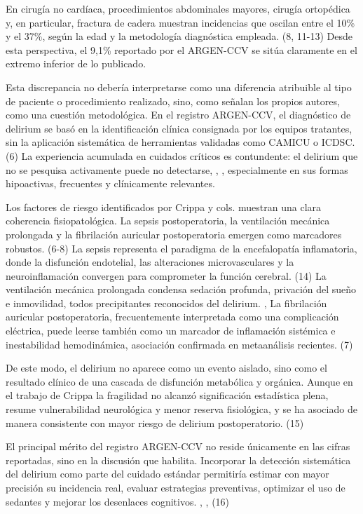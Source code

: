 \documentclass{article}
\begin{document}
En cirugía no cardíaca, procedimientos abdominales mayores, cirugía ortopédica y, en particular, fractura de cadera muestran incidencias que oscilan entre el 10\% y el 37\%, según la edad y la metodología diagnóstica empleada. (8, 11-13) Desde esta perspectiva, el 9,1\% reportado por el ARGEN-CCV se sitúa claramente en el extremo inferior de lo publicado.

Esta discrepancia no debería interpretarse como una diferencia atribuible al tipo de paciente o procedimiento realizado, sino, como señalan los propios autores, como una cuestión metodológica. En el registro ARGEN-CCV, el diagnóstico de delirium se basó en la identificación clínica consignada por los equipos tratantes, sin la aplicación sistemática de herramientas validadas como CAMICU o ICDSC. (6) La experiencia acumulada en cuidados críticos es contundente: el delirium que no se pesquisa activamente puede no detectarse, \cite{1262-ELY2004}, \cite{1298-INOUYE2014}, \cite{1299-WILSON2020} especialmente en sus formas hipoactivas, frecuentes y clínicamente relevantes.

Los factores de riesgo identificados por Crippa y cols. muestran una clara coherencia fisiopatológica. La sepsis postoperatoria, la ventilación mecánica prolongada y la fibrilación auricular postoperatoria emergen como marcadores robustos. (6-8) La sepsis representa el paradigma de la encefalopatía inflamatoria, donde la disfunción endotelial, las alteraciones microvasculares y la neuroinflamación convergen para comprometer la función cerebral. (14) La ventilación mecánica prolongada condensa sedación profunda, privación del sueño e inmovilidad, todos precipitantes reconocidos del delirium. \cite{1262-ELY2004}, \cite{1298-INOUYE2014} La fibrilación auricular postoperatoria, frecuentemente interpretada como una complicación eléctrica, puede leerse también como un marcador de inflamación sistémica e inestabilidad hemodinámica, asociación confirmada en metaanálisis recientes. (7)

De este modo, el delirium no aparece como un evento aislado, sino como el resultado clínico de una cascada de disfunción metabólica y orgánica. Aunque en el trabajo de Crippa la fragilidad no alcanzó significación estadística plena, resume vulnerabilidad neurológica y menor reserva fisiológica, y se ha asociado de manera consistente con mayor riesgo de delirium postoperatorio. (15)

El principal mérito del registro ARGEN-CCV no reside únicamente en las cifras reportadas, sino en la discusión que habilita. Incorporar la detección sistemática del delirium como parte del cuidado estándar permitiría estimar con mayor precisión su incidencia real, evaluar estrategias preventivas, optimizar el uso de sedantes y mejorar los desenlaces cognitivos. \cite{1262-ELY2004}, \cite{1298-INOUYE2014}, \cite{1299-WILSON2020} (16)
\end{document}

